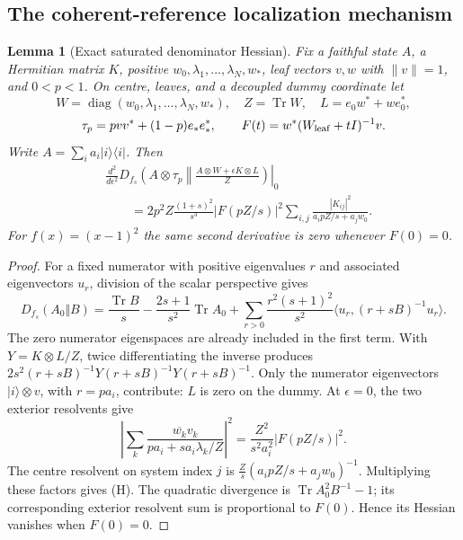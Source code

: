 \documentclass[11pt]{article}
\newtheorem{lemma}{Lemma}
\newcommand{\Tr}{\operatorname{Tr}}
\begin{document}
\subsection{The coherent-reference localization mechanism}
\begin{lemma}[Exact saturated denominator Hessian]\label{lem:hessian}
Fix a faithful state $A$, a Hermitian matrix $K$, positive $w_0,\lambda_1,\ldots,\lambda_N,w_*$, leaf vectors $v,w$ with $\|v\|=1$, and $0<p<1$. On centre, leaves, and a decoupled dummy coordinate let
\[
 W=\operatorname{diag}(w_0,\lambda_1,\ldots,\lambda_N,w_*),\quad
 Z=\Tr W,\quad L=e_0w^*+we_0^*,
\]
\[
 \tau_p=pvv^*+(1-p)e_*e_*^*,\qquad
 F(t)=w^*(W_{\rm leaf}+tI)^{-1}v.
\]
Write $A=\sum_i a_i|i\rangle\langle i|$. Then
\begin{align*}
 &\left.\frac{d^2}{d\epsilon^2}
 D_{f_s}\left(A\otimes\tau_p\middle\Vert
 \frac{A\otimes W+\epsilon K\otimes L}{Z}\right)\right|_{0}\\
 &\qquad=2p^2Z\frac{(1+s)^2}{s^3}|F(pZ/s)|^2
 \sum_{i,j}\frac{|K_{ij}|^2}{a_i pZ/s+a_jw_0}. \tag{H}
\end{align*}
For $f(x)=(x-1)^2$ the same second derivative is zero whenever $F(0)=0$.
\end{lemma}

\begin{proof}
For a fixed numerator with positive eigenvalues $r$ and associated eigenvectors $u_r$, division of the scalar perspective gives
\[
 D_{f_s}(A_0\Vert B)=\frac{\Tr B}{s}-\frac{2s+1}{s^2}\Tr A_0
 +\sum_{r>0}\frac{r^2(s+1)^2}{s^2}
 \langle u_r,(r+sB)^{-1}u_r\rangle.
\]
The zero numerator eigenspaces are already included in the first term. With $Y=K\otimes L/Z$, twice differentiating the inverse produces
$2s^2(r+sB)^{-1}Y(r+sB)^{-1}Y(r+sB)^{-1}$.
Only the numerator eigenvectors $|i\rangle\otimes v$, with $r=pa_i$, contribute: $L$ is zero on the dummy. At $\epsilon=0$, the two exterior resolvents give
\[
 \left|\sum_k\frac{\overline{w_k}v_k}{pa_i+sa_i\lambda_k/Z}\right|^2
 =\frac{Z^2}{s^2a_i^2}|F(pZ/s)|^2.
\]
The centre resolvent on system index $j$ is
$\frac{Z}{s}(a_i pZ/s+a_jw_0)^{-1}$. Multiplying these factors gives (H).
The quadratic divergence is $\Tr A_0^2B^{-1}-1$; its corresponding exterior resolvent sum is proportional to $F(0)$. Hence its Hessian vanishes when $F(0)=0$.
\end{proof}
\end{document}
